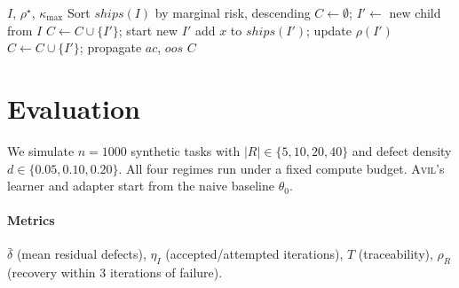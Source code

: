 \documentclass[10pt,twocolumn,letterpaper]{article}
\theoremstyle{definition}
\theoremstyle{plain}
\newcommand{\AVIL}{\textsc{Avil}}
\begin{document}
\begin{algorithm}[t]
\caption{Risk-based iteration splitting}\label{alg:split}
\begin{algorithmic}[1]
\small
\Require $I$, $\rho^\star$, $\kappa_{\max}$
\State Sort $\mathit{ships}(I)$ by marginal risk, descending
\State $C\gets\emptyset$;\; $I'\gets$ new child from $I$
     \State $C\gets C\cup\{I'\}$; start new $I'$
  \EndIf
  \State add $x$ to $\mathit{ships}(I')$; update $\rho(I')$
\EndFor
\State $C\gets C\cup\{I'\}$;\;
       propagate $\mathit{ac}$, $\mathit{oos}$
\State\Return $C$
\end{algorithmic}
\end{algorithm}

\section{Evaluation}\label{sec:evaluation}

We simulate $n=1000$ synthetic tasks with $|R|\in\{5,10,20,40\}$ and
defect density $d\in\{0.05,0.10,0.20\}$. All four regimes run under
a fixed compute budget. \AVIL{}'s learner and adapter start from the
naive baseline $\theta_0$.

\paragraph{Metrics}
$\bar\delta$ (mean residual defects),
$\eta_I$ (accepted/attempted iterations),
$T$ (traceability),
$\rho_R$ (recovery within 3 iterations of failure).
\end{document}
